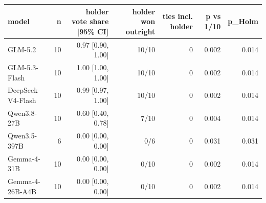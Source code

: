 \begin{tabular}{lrrrrrr}
\toprule
\textbf{model} & \textbf{n} & \textbf{holder vote share [95\% CI]} & \textbf{holder won outright} & \textbf{ties incl. holder} & \textbf{p vs 1/10} & \textbf{p\_Holm} \\
\midrule
GLM-5.2 & 10 & 0.97 [0.90, 1.00] & 10/10 & 0 & 0.002 & 0.014 \\
GLM-5.3-Flash & 10 & 1.00 [1.00, 1.00] & 10/10 & 0 & 0.002 & 0.014 \\
DeepSeek-V4-Flash & 10 & 0.99 [0.97, 1.00] & 10/10 & 0 & 0.002 & 0.014 \\
Qwen3.8-27B & 10 & 0.60 [0.40, 0.78] & 7/10 & 0 & 0.004 & 0.014 \\
Qwen3.5-397B & 6 & 0.00 [0.00, 0.00] & 0/6 & 0 & 0.031 & 0.031 \\
Gemma-4-31B & 10 & 0.00 [0.00, 0.00] & 0/10 & 0 & 0.002 & 0.014 \\
Gemma-4-26B-A4B & 10 & 0.00 [0.00, 0.00] & 0/10 & 0 & 0.002 & 0.014 \\
\bottomrule
\end{tabular}
